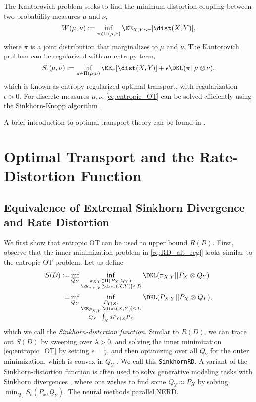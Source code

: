 \documentclass[11pt]{article}
\begin{document}
    The Kantorovich problem seeks to find the minimum distortion coupling between two probability measures $\mu$ and $\nu$,
    \begin{equation}
        W(\mu, \nu) := \inf_{\substack{\pi \in \Pi(\mu, \nu)}} \EE_{X,Y\sim \pi}[\dist(X,Y)],
    \end{equation}
    where $\pi$ is a joint distribution that marginalizes to $\mu$ and $\nu$. The Kantorovich problem can be regularized with an entropy term, 
    \begin{equation}
        S_\epsilon(\mu, \nu) := \inf_{\substack{\pi \in \Pi(\mu, \nu)}} \EE_{\pi}[\dist(X,Y)] + \epsilon \DKL(\pi||\mu \otimes \nu),
        \label{eq:entropic_OT}
    \end{equation}
    which is known as entropy-regularized optimal transport, with regularization $\epsilon > 0$. For discrete measures $\mu,\nu$, \eqref{eq:entropic_OT} can be solved efficiently using the Sinkhorn-Knopp algorithm \cite{sinkhorn, knopp_sinkhorn}.

    A brief introduction to optimal transport theory can be found in \cite{CourseNotesOT, ComputationalOT}. 

    \section{Optimal Transport and the Rate-Distortion Function}
    \subsection{Equivalence of Extremal Sinkhorn Divergence and Rate Distortion}
    We first show that entropic OT can be used to upper bound $R(D)$. First, observe that the inner minimization problem in \eqref{eq:RD_alt_regl} looks similar to the entropic OT problem. Let us define 
    \begin{align}
        S(D) :=& \inf_{Q_Y} \inf_{\substack{\pi_{XY} \in \Pi(P_X, Q_Y): \\ \EE_{\pi_{X,Y}}[\dist(X,Y)]  \leq D }} \DKL(\pi_{X,Y}||P_X \otimes Q_Y) \label{eq:SD_1}\\ 
        =&\inf_{Q_Y} \inf_{\substack{P_{Y|X}: \\ \EE_{P_{X,Y}}[\dist(X,Y)]  \leq D \\ Q_Y = \int_{\mathcal{X}} dP_{Y|X}P_X}} \DKL(P_{X,Y}||P_X \otimes Q_Y), \label{eq:SD_2}
    \end{align}
    which we call the \emph{Sinkhorn-distortion function}. Similar to $R(D)$, we can trace out $S(D)$ by sweeping over $\lambda > 0$, and solving the inner minimization \eqref{eq:entropic_OT} by setting  $\epsilon = \frac{1}{\lambda}$, and then optimizing over all $Q_Y$ for the outer minimization, which is convex in $Q_Y$ \cite{feydy2019interpolating}. We call this \texttt{SinkhornRD}. A variant of the Sinkhorn-distortion function is often used to solve generative modeling tasks with Sinkhorn divergences \cite{sinkhornGAN, salimans2018improving, shen2020sinkhorn}, where one wishes to find some $Q_Y \approx P_X$ by solving $\min_{Q_Y} S_\epsilon (P_x, Q_Y)$. The neural methods parallel NERD.
\end{document}
